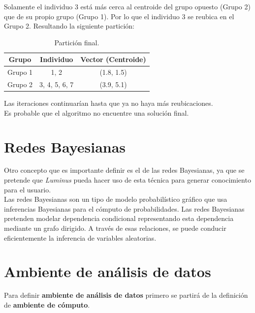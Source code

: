 \begin{UClist}
	\UCli Solamente el individuo 3 está más cerca al centroide del grupo opuesto (Grupo 2) que de su propio grupo (Grupo 1). Por lo que el individuo 3 se reubica en el Grupo 2. Resultando la siguiente partición:\\

	\begin{table}[H]
		\begin{center}
			\label{tab:particionFinal}
			\begin{tabular}{c|c|c}
				\textbf{Grupo} & \textbf{Individuo} & \textbf{Vector (Centroide)}\\
				\hline
				Grupo 1 & 1, 2 & (1.8, 1.5)\\
				Grupo 2 & 3, 4, 5, 6, 7 & (3.9, 5.1)\\
			\end{tabular}
		\end{center}
		\caption{Partición final.}
	\end{table}

	\UCli Las iteraciones continuarían hasta que ya no haya más reubicaciones.\\

	\UCli Es probable que el algoritmo no encuentre una solución final.

\end{UClist}

\section{Redes Bayesianas}
Otro concepto que es importante definir es el de las redes Bayesianas, ya que se pretende que \emph{Luminus} pueda hacer uso de esta técnica para generar conocimiento para el usuario.\\ 

Las redes Bayesianas son un tipo de modelo probabilístico gráfico que usa inferencias Bayesianas para el cómputo de probabilidades. Las redes Bayesianas pretenden modelar dependencia condicional representando esta dependencia mediante un grafo dirigido. A través de esas relaciones, se puede conducir eficientemente la inferencia de variables aleatorias.\cite{bayesianas}\\

\section{Ambiente de análisis de datos}
\label{ambienteAnalisis}
Para definir \textbf{ambiente de análisis de datos} primero se partirá de la definición de \textbf{ambiente de cómputo}.\\

